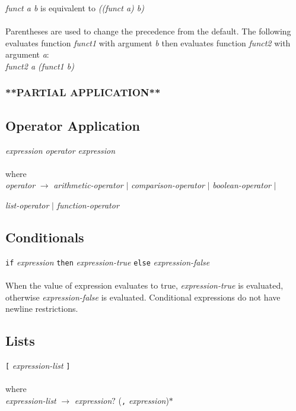     \emph{funct a b}  is equivalent to \emph{((funct a) b)} \\ \\
    Parentheses are used to change the precedence from the default. The following evaluates function \emph{funct1} with argument \emph{b} then 
    evaluates function \emph{funct2} with argument \emph{a}: \\
    
    \emph{funct2 a (funct1 b)}

  \subsubsection{**PARTIAL APPLICATION**}
  

\subsection{Operator Application}
    \emph{expression  operator  expression}\\ \\
    where\\
    
    \emph{operator} $\rightarrow$ \emph{arithmetic-operator} $ | $  \emph{comparison-operator} $ | $ \emph{boolean-operator} $ | $ 
    
    \emph{list-operator} $ | $ \emph{function-operator}
    
\subsection{Conditionals}
  \texttt{if}  \emph{expression}  \texttt{then}  \emph{expression-true}  \texttt{else}  \emph{expression-false} \\ \\
  When the value of expression evaluates to true,  \emph{expression-true} is evaluated, otherwise  \emph{expression-false} is evaluated. Conditional expressions do not have newline restrictions.

\subsection{Lists}
  \texttt{[} \emph{expression-list} \texttt{]} \\ \\
  where \\
  
  \emph{expression-list} $\rightarrow$  \emph{expression}$?$ (\texttt{,} \emph{expression})$*$
  
